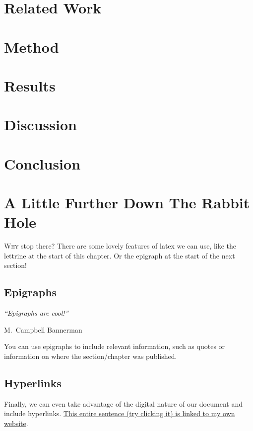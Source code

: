 \documentclass[12pt, BEng]{UoAThesis}
\begin{document}
\chapter{Related Work}

\chapter{Method}

\chapter{Results}

\chapter{Discussion}

\chapter{Conclusion}

\chapter{A Little Further Down The Rabbit Hole}
\lettrine{W}{hy} stop there? There are some lovely features of latex
we can use, like the lettrine at the start of this chapter. Or the
epigraph at the start of the next section!
\section{Epigraphs}
\epigraph{{\em ``Epigraphs are cool!''}}{M.~Campbell Bannerman}

You can use epigraphs to include relevant information, such as quotes
or information on where the section/chapter was published.

\section{Hyperlinks}
Finally, we can even take advantage of the digital nature of our
document and include
hyperlinks. \href{https://marcusbannerman.co.uk/images/stories/pdfs/thesis.pdf}{
  This entire sentence (try clicking it) is linked to my own website}.

\printbibliography[heading=thesisChapterBib]
\end{document}
